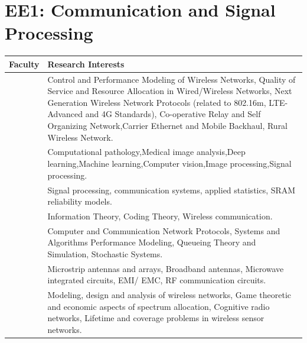 \documentclass[openany]{book} %
\begin{document}
\section{EE1: Communication and Signal Processing}
\begin{tabular}{p{4.5cm} p{9cm}}

\hline 
\hline 
Faculty & Research Interests \\ 
\hline
\hline 

\href{http://www.iitb.ac.in/en/employee/prof-abhay-karandikar}{\color{blue}{Prof. Abhay Karandikar }} & Control and Performance Modeling of Wireless Networks, Quality of Service and Resource Allocation in Wired/Wireless Networks, Next Generation Wireless Network Protocols (related to 802.16m, LTE-Advanced and 4G Standards), Co-operative Relay and Self Organizing Network,Carrier Ethernet and Mobile Backhaul, Rural Wireless Network. \\ 
\hline

\href{https://www.ee.iitb.ac.in/~asethi/}{\color{blue}{Prof. Amit Sethi }} & Computational pathology,Medical image analysis,Deep learning,Machine learning,Computer vision,Image processing,Signal processing. \\ 
\hline 

\href{https://www.ee.iitb.ac.in/~animesh/}{\color{blue}{Prof. Animesh Kumar }} & Signal processing, communication systems, applied statistics, SRAM reliability models. \\ 
\hline

\href{https://www.ee.iitb.ac.in/wiki/faculty/bikash}{\color{blue}{Prof. Bikash Kumar Dey }} & Information Theory, Coding Theory, Wireless communication. \\ 
\hline 

\href{https://www.ee.iitb.ac.in/~dmanju/}{\color{blue}{Prof. D. Manjunath }} & Computer and Communication Network Protocols, Systems and Algorithms Performance Modeling, Queueing Theory and Simulation, Stochastic
Systems. \\ 
\hline 

\href{https://www.ee.iitb.ac.in/wiki/faculty/gkumar}{\color{blue}{Prof. Girish Kumar }} & Microstrip antennas and arrays, Broadband antennas, Microwave integrated circuits, EMI/ EMC, RF communication circuits. \\ 
\hline 

\href{https://www.ee.iitb.ac.in/~gskasbekar/}{\color{blue}{Prof. Gaurav S. Kasbekar}} & Modeling, design and analysis of wireless networks, Game theoretic and economic aspects of spectrum allocation, Cognitive radio networks,
Lifetime and coverage problems in wireless sensor networks. \\ 
\hline 


\end{tabular}
\end{document}
